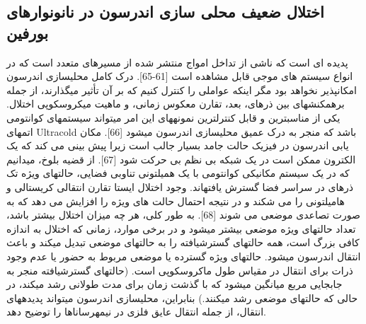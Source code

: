 \subsection{اختلال ضعیف محلی سازی اندرسون در نانونوارهای بورفین}
پدیده ای است که ناشی از تداخل امواج منتشر شده از مسیرهای متعدد است که در انواع سیستم های موجی قابل مشاهده است [61-65]. درک کامل محلیسازی اندرسون امکانپذیر نخواهد بود مگر اینکه عواملی را کنترل کنیم که بر آن تأثیر میگذارند، از جمله برهمکنشهای بین ذرهای، بعد، تقارن معکوس زمانی، و ماهیت میکروسکوپی اختلال. یکی از مناسبترین و قابل کنترلترین نمونههای این امر میتواند سیستمهای کوانتومی اتمهای Ultracold باشد که منجر به درک عمیق محلیسازی اندرسون میشود [66]. مکان یابی اندرسون در فیزیک حالت جامد بسیار جالب است زیرا پیش بینی می کند که یک الکترون ممکن است در یک شبکه بی نظم بی حرکت شود [67]. از قضیه بلوخ، میدانیم که در یک سیستم مکانیکی کوانتومی با یک همیلتونی تناوبی فضایی، حالتهای ویژه تک ذرهای در سراسر فضا گسترش یافتهاند. وجود اختلال ایستا تقارن انتقالی کریستالی و هامیلتونی را می شکند و در نتیجه احتمال حالت های ویژه را افزایش می دهد که به صورت تصاعدی موضعی می شوند [68]. به طور کلی، هر چه میزان اختلال بیشتر باشد، تعداد حالتهای ویژه موضعی بیشتر میشود و در برخی موارد، زمانی که اختلال به اندازه کافی بزرگ است، همه حالتهای گسترشیافته را به حالتهای موضعی تبدیل میکند و باعث انتقال اندرسون میشود. حالتهای ویژه گسترده یا موضعی مربوط به حضور یا عدم وجود ذرات برای انتقال در مقیاس طول ماکروسکوپی است. (حالتهای گسترشیافته منجر به جابجایی مربع میانگین میشود که با گذشت زمان برای مدت طولانی رشد میکند، در حالی که حالتهای موضعی رشد میکنند.) بنابراین، محلیسازی اندرسون میتواند پدیدههای انتقال، از جمله انتقال عایق فلزی در نیمهرساناها را توضیح دهد.

